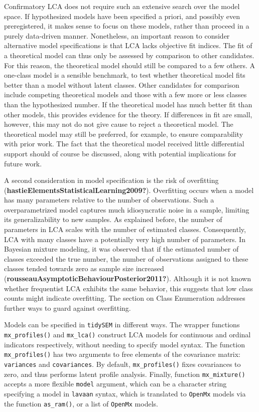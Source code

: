 \documentclass[
  ,man,floatsintext]{apa6}
\begin{document}
Confirmatory LCA does not require such an extensive search over the model space.
If hypothesized models have been specified a priori,
and possibly even preregistered,
it makes sense to focus on these models, rather than proceed in a purely data-driven manner.
Nonetheless, an important reason to consider alternative model specifications is that LCA lacks objective fit indices.
The fit of a theoretical model can thus only be assessed by comparison to other candidates.
For this reason, the theoretical model should still be compared to a few others.
A one-class model is a sensible benchmark,
to test whether theoretical model fits better than a model without latent classes.
Other candidates for comparison include competing theoretical models and those with a few more or less classes than the hypothesized number.
If the theoretical model has much better fit than other models,
this provides evidence for the theory.
If differences in fit are small, however, this may not do not give cause to reject a theoretical model.
The theoretical model may still be preferred, for example, to ensure comparability with prior work.
The fact that the theoretical model received little differential support should of course be discussed,
along with potential implications for future work.

A second consideration in model specification is the risk of overfitting (\textbf{hastieElementsStatisticalLearning2009?}).
Overfitting occurs when a model has many parameters relative to the number of observations.
Such a overparametrized model captures much idiosyncratic noise in a sample,
limiting its generalizability to new samples.
As explained before, the number of parameters in LCA scales with the number of estimated classes.
Consequently, LCA with many classes have a potentially very high number of parameters.
In Bayesian mixture modeling,
it was observed that if the estimated number of classes exceeded the true number, the number of observations assigned to these classes tended towards zero as sample size increased (\textbf{rousseauAsymptoticBehaviourPosterior2011?}).
Although it is not known whether frequentist LCA exhibits the same behavior,
this suggests that low class counts might indicate overfitting.
The section on Class Enumeration addresses further ways to guard against overfitting.

Models can be specified in \texttt{tidySEM} in different ways.
The wrapper functions \texttt{mx\_profiles()} and \texttt{mx\_lca()} construct LCA models for continuous and ordinal indicators respectively, without needing to specify model syntax.
The function \texttt{mx\_profiles()} has two arguments to free elements of the covariance matrix: \texttt{variances} and \texttt{covariances}.
By default, \texttt{mx\_profiles()} fixes covariances to zero, and thus performs latent profile analysis.
Finally, function \texttt{mx\_mixture()} accepts a more flexible \texttt{model} argument, which can be a character string specifying a model in \texttt{lavaan} syntax,
which is translated to \texttt{OpenMx} models via the function \texttt{as\_ram()},
or a list of \texttt{OpenMx} models.
\end{document}
